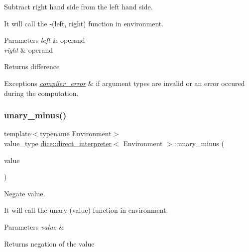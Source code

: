 Subtract right hand side from the left hand side. 

It will call the -\/(left, right) function in environment.


\begin{DoxyParams}{Parameters}
{\em left} & operand \\
\hline
{\em right} & operand\\
\hline
\end{DoxyParams}
\begin{DoxyReturn}{Returns}
difference
\end{DoxyReturn}

\begin{DoxyExceptions}{Exceptions}
{\em \mbox{\hyperlink{classdice_1_1compiler__error}{compiler\+\_\+error}}} & if argument types are invalid or an error occured during the computation. \\
\hline
\end{DoxyExceptions}
\mbox{\label{classdice_1_1direct__interpreter_a3af601a42a6f731123331eb1862e4ccc}} 
\subsubsection{\texorpdfstring{unary\+\_\+minus()}{unary\_minus()}}
{\footnotesize\ttfamily template$<$typename Environment$>$ \\
value\+\_\+type \mbox{\hyperlink{classdice_1_1direct__interpreter}{dice\+::direct\+\_\+interpreter}}$<$ Environment $>$\+::unary\+\_\+minus (\begin{DoxyParamCaption}\item[{value\+\_\+type}]{value }\end{DoxyParamCaption})\hspace{0.3cm}{\ttfamily [inline]}}



Negate value. 

It will call the unary-\/(value) function in environment.


\begin{DoxyParams}{Parameters}
{\em value} & \\
\hline
\end{DoxyParams}
\begin{DoxyReturn}{Returns}
negation of the value
\end{DoxyReturn}

